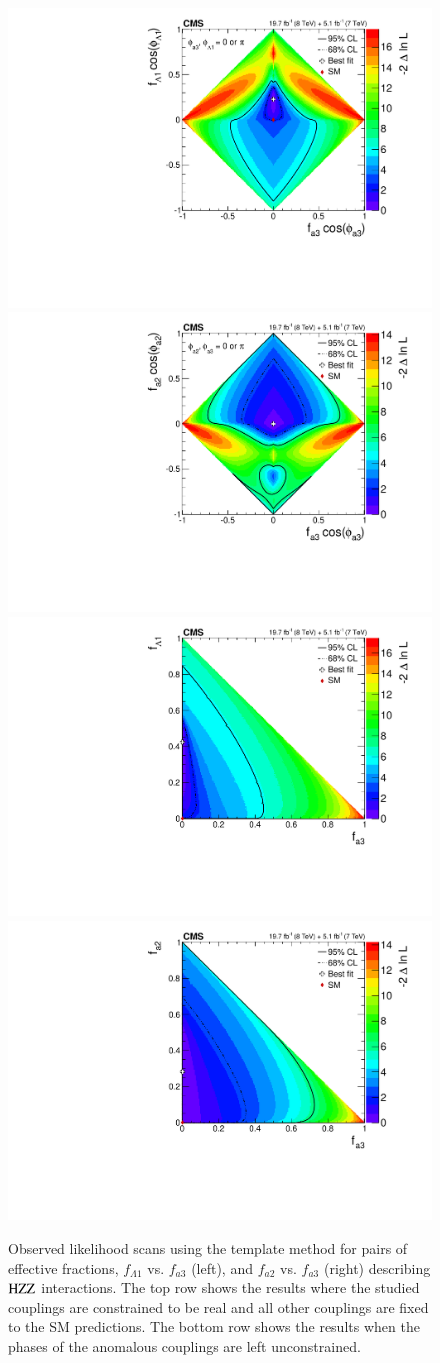 \begin{enumerate}
\begin{figure}[!htbp]
\begin{center}
        \includegraphics[width=0.49\linewidth,angle=0]{figures/fL1_vs_fa3_Real.pdf}
        \includegraphics[width=0.49\linewidth,angle=0]{figures/fa2_vs_fa3_Real.pdf} \\
        \includegraphics[width=0.49\linewidth,angle=0]{figures/fL1_vs_fa3_Profile.pdf}
        \includegraphics[width=0.49\linewidth,angle=0]{figures/fa2_vs_fa3_Profile.pdf}
        \caption{ Observed likelihood scans using the template method
        for pairs of effective fractions, $f_{\Lambda1}$ vs. $f_{a3}$
        (left), and $f_{a2}$ vs. $f_{a3}$ (right) describing
        $\mathrm{H}\mathrm{Z}\mathrm{Z}$ interactions.  The top row shows the results where
        the studied couplings are constrained to be real and all other
        couplings are fixed to the SM predictions.  The bottom row
        shows the results when the phases of the anomalous couplings
        are left unconstrained.  \label{fig:results_ZZ_2D} }
\end{center}
\end{figure}

\end{enumerate}

